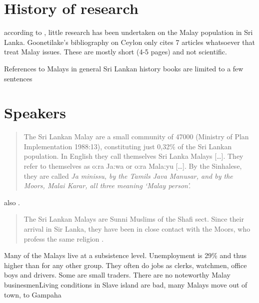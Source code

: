 \section{History of research}
according to \citet[7,22]{Hussainmiya1990}, little research has
been undertaken on the Malay population in Sri Lanka.
Goonetilake's bibliography on Ceylon %
 only
cites 7 articles whatsoever that treat Malay issues. These are
mostly short (4-5 pages) and not scientific.

References to Malays in general Sri Lankan history books are limited to a few sentences

\section{Speakers}
\begin{quote}
The Sri Lankan Malay are a small community of 47000 (Ministry of Plan Implementation 1988:13), constituting just 0,32\% of the Sri Lankan population. In English they call themselves Sri Lanka Malays [\dots]. They refer to themselves as o:ra\ng{} Ja:wa or o:ra\ng{} Mala:yu [\dots]. By the Sinhalese, they are called \em Ja minissu\em, by the Tamils \em Java Manusar\em, and by the Moors, \em Malai Karar\em, all three meaning `Malay person'\citep[1]{Bichsel}. 
\end{quote}
also \citep[17]{Hussainmiya1990}.

\begin{quote}
The Sri Lankan Malays are Sunni Muslims of the Shafi sect. Since their arrival in Sir Lanka, they have been in close contact with the Moors, who profess the same religion \citep[1]{Bichsel}.
\end{quote}
\citep[cf.][42]{Hussainmiya1990}

Many of the Malays live at a subsistence level. Unemployment is
29\% and thus higher than for any other group. They often do jobs
as clerks, watchmen, office boys and drivers. Some are small
traders. There are no noteworthy Malay
businesmenLiving conditions in Slave
island are bad, many Malays move out of town, to
Gampaha\citep[21]{Hussainmiya1990}

